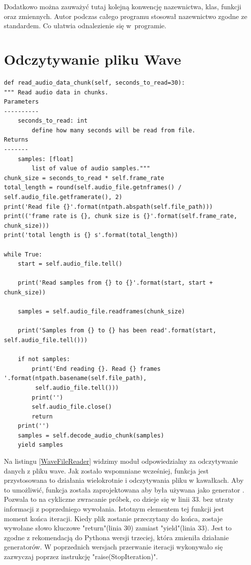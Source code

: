 \documentclass[eng,printmode]{mgr}
\begin{document}
Dodatkowo można zauważyć tutaj kolejną konwencję nazewnictwa, klas, funkcji oraz zmiennych. Autor podczas całego programu stosował nazewnictwo zgodne ze standardem\newline\cite{PEP8}. Co ułatwia odnalezienie się w~programie.


\section{Odczytywanie pliku Wave}
\begin{minipage}{\linewidth}
\begin{lstlisting}[caption={fragment kodu źródłowego pliku WaveFileReader.py},captionpos=b,label={WaveFileReader}]
def read_audio_data_chunk(self, seconds_to_read=30):
""" Read audio data in chunks.
Parameters
----------
    seconds_to_read: int
        define how many seconds will be read from file.
Returns
-------
    samples: [float]
        list of value of audio samples."""
chunk_size = seconds_to_read * self.frame_rate
total_length = round(self.audio_file.getnframes() / self.audio_file.getframerate(), 2)
print('Read file {}'.format(ntpath.abspath(self.file_path)))
print(('frame rate is {}, chunk size is {}'.format(self.frame_rate, chunk_size)))
print('total length is {} s'.format(total_length))

while True:
    start = self.audio_file.tell()

    print('Read samples from {} to {}'.format(start, start + chunk_size))
                                             
    samples = self.audio_file.readframes(chunk_size)

    print('Samples from {} to {} has been read'.format(start, self.audio_file.tell()))

    if not samples:
        print('End reading {}. Read {} frames '.format(ntpath.basename(self.file_path),
         self.audio_file.tell()))
        print('')
        self.audio_file.close()
        return
    print('')
    samples = self.decode_audio_chunk(samples)
    yield samples
\end{lstlisting}
\end{minipage}
Na listingu \ref{WaveFileReader} widzimy moduł odpowiedzialny za odczytywanie danych z pliku wave. Jak zostało wspomniane wcześniej, funkcja jest przystosowana to działania wielokrotnie i odczytywania pliku w kawałkach. Aby to umożliwić, funkcja została zaprojektowana aby była używana jako generator \cite{Generator}. Pozwala to na cykliczne zwracanie próbek, co dzieje się w linii 33. bez utraty informacji z poprzedniego wywołania. Istotnym elementem tej funkcji jest moment końca iteracji. Kiedy plik zostanie przeczytany do końca, zostaje wywołane słowo kluczowe "return"(linia 30) zamiast "yield"(linia 33). Jest to zgodne z rekomendacją do Pythona wersji trzeciej, \cite{return} która zmieniła działanie generatorów. W poprzednich wersjach przerwanie iteracji wykonywało się zazwyczaj poprzez instrukcję "raise(StopIteration)". 
\end{document}

